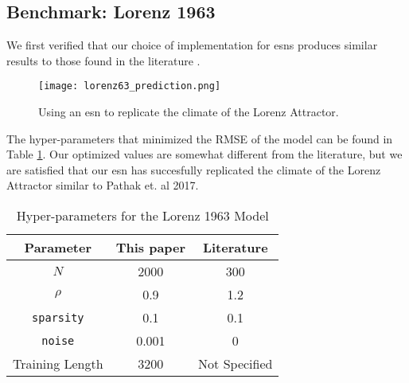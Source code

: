 \subsection{Benchmark: Lorenz 1963}

We first verified that our choice of implementation for \glspl{esn}
produces similar results to those found in the literature \cite{pathak_using_2017}.
\begin{figure}[ht]
  \texttt{[image: lorenz63\_prediction.png]}
  \caption{Using an \gls{esn} to replicate the climate of the Lorenz Attractor.}
  \label{fig:lorenz63}
\end{figure}
The hyper-parameters that minimized the RMSE of the model can be found in Table
\ref{tab:lorenzparam}. Our optimized values are somewhat different from the literature, but we are satisfied that our \gls{esn} has succesfully
replicated the climate of the Lorenz Attractor similar to Pathak et. al 2017.
\begin{table}[ht]
  \centering
  \caption{Hyper-parameters for the Lorenz 1963 Model}
  \label{tab:lorenzparam}
  \begin{tabular}{c|c|c}
    \hline
    Parameter & This paper & Literature \cite{pathak_using_2017}\\
    \hline
    $N$ & 2000& 300\\
    $\rho$& 0.9&1.2\\
    \texttt{sparsity}& 0.1& 0.1\\
    \texttt{noise}& 0.001& 0\\
    Training Length & 3200& Not Specified\\
  \end{tabular}
\end{table}
